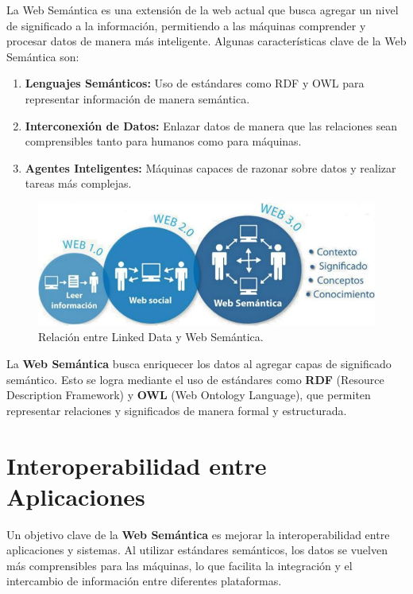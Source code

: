 \documentclass[11pt]{report}
\begin{document}
	La Web Semántica es una extensión de la web actual que busca agregar un nivel de significado a la información, permitiendo a las máquinas comprender y procesar datos de manera más inteligente. Algunas características clave de la Web Semántica son:
	
	\begin{enumerate}
		\item \textbf{Lenguajes Semánticos:} Uso de estándares como RDF y OWL para representar información de manera semántica.
	   
		\item \textbf{Interconexión de Datos:} Enlazar datos de manera que las relaciones sean comprensibles tanto para humanos como para máquinas.
		
		\item \textbf{Agentes Inteligentes:} Máquinas capaces de razonar sobre datos y realizar tareas más complejas.
	\end{enumerate}
		
	\begin{figure}[H]
		\centering
		\includegraphics[scale=0.4]{../img/websemantica.jpg}
		\caption{Relación entre Linked Data y Web Semántica.}
		\label{fig:websemantica}
	\end{figure}

	La \textbf{Web Semántica} busca enriquecer los datos al agregar capas de significado semántico. Esto se logra mediante el uso de estándares como \textbf{RDF} (Resource Description Framework) y \textbf{OWL} (Web Ontology Language), que permiten representar relaciones y significados de manera formal y estructurada.

	\section{Interoperabilidad entre Aplicaciones}

	Un objetivo clave de la \textbf{Web Semántica} es mejorar la interoperabilidad entre aplicaciones y sistemas. Al utilizar estándares semánticos, los datos se vuelven más comprensibles para las máquinas, lo que facilita la integración y el intercambio de información entre diferentes plataformas.
\end{document}
